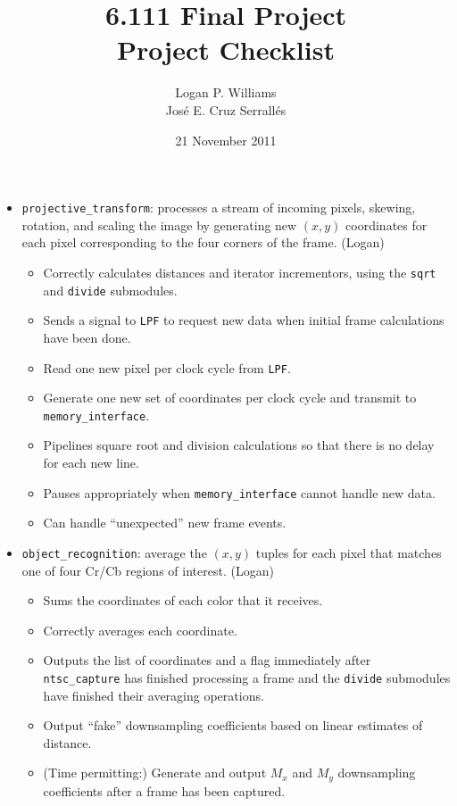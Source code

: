 \documentclass{article}
\title{6.111 Final Project\\Project Checklist}
\date{21 November 2011}
\author{Logan P. Williams\\Jos\'{e} E. Cruz Serrall\'{e}s}
\begin{document}
\maketitle

\begin{itemize}
\item[] {\tt projective\_transform}: processes a stream of incoming pixels, skewing, rotation, and scaling the image by generating new $(x,y)$ coordinates for each pixel corresponding to the four corners of the frame. (Logan)
	\begin{itemize}
	\item Correctly calculates distances and iterator incrementors, using the {\tt sqrt} and {\tt divide} submodules. 
	\item Sends a signal to {\tt LPF} to request new data when initial frame calculations have been done.
	\item Read one new pixel per clock cycle from {\tt LPF}.
	\item Generate one new set of coordinates per clock cycle and transmit to {\tt memory\_interface}.
	\item Pipelines square root and division calculations so that there is no delay for each new line.
	\item Pauses appropriately when {\tt memory\_interface} cannot handle new data.
	\item Can handle ``unexpected'' new frame events.
	\end{itemize}

\item[] {\tt object\_recognition}: average the $(x,y)$ tuples for each pixel that matches one of four Cr/Cb regions of interest. (Logan)
	\begin{itemize}
	\item Sums the coordinates of each color that it receives.
	\item Correctly averages each coordinate.
	\item Outputs the list of coordinates and a flag immediately after {\tt ntsc\_capture} has finished processing a frame and the {\tt divide} submodules have finished their averaging operations.
	\item Output ``fake'' downsampling coefficients based on linear estimates of distance.
	\item (Time permitting:) Generate and output $M_x$ and $M_y$ downsampling coefficients after a frame has been captured.
	\end{itemize}


\end{itemize}
\end{document}

